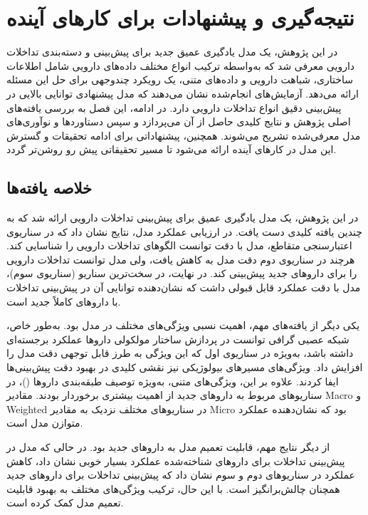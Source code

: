 \chapter{نتیجه‌گیری و پیشنهادات برای کارهای آینده}

در این پژوهش، یک مدل یادگیری عمیق جدید برای پیش‌بینی و دسته‌بندی تداخلات دارویی معرفی شد که به‌واسطه ترکیب انواع مختلف داده‌های دارویی شامل اطلاعات ساختاری، شباهت دارویی و داده‌های متنی، یک رویکرد چندوجهی برای حل این مسئله ارائه می‌دهد. آزمایش‌های انجام‌شده نشان می‌دهند که مدل پیشنهادی توانایی بالایی در پیش‌بینی دقیق انواع تداخلات دارویی دارد. در ادامه، این فصل به بررسی یافته‌های اصلی پژوهش و نتایج کلیدی حاصل از آن می‌پردازد و سپس دستاوردها و نوآوری‌های مدل معرفی‌شده تشریح می‌شوند. همچنین، پیشنهاداتی برای ادامه تحقیقات و گسترش این مدل در کارهای آینده ارائه می‌شود تا مسیر تحقیقاتی پیش رو روشن‌تر گردد.

\section{خلاصه یافته‌ها}

در این پژوهش، یک مدل یادگیری عمیق برای پیش‌بینی تداخلات دارویی ارائه شد که به چندین یافته کلیدی دست یافت. در ارزیابی عملکرد مدل، نتایج نشان داد که در سناریوی اعتبارسنجی متقاطع، مدل با دقت  توانست الگوهای تداخلات دارویی را شناسایی کند. هرچند در سناریوی دوم دقت مدل به  کاهش یافت، ولی مدل توانست تداخلات دارویی را برای داروهای جدید پیش‌بینی کند. در نهایت، در سخت‌ترین سناریو (سناریوی سوم)، مدل با دقت  عملکرد قابل قبولی داشت که نشان‌دهنده توانایی آن در پیش‌بینی تداخلات با داروهای کاملاً جدید است.	

یکی دیگر از یافته‌های مهم، اهمیت نسبی ویژگی‌های مختلف در مدل بود. به‌طور خاص، شبکه عصبی گرافی توانست در پردازش ساختار مولکولی داروها عملکرد برجسته‌ای داشته باشد، به‌ویژه در سناریوی اول که این ویژگی به طرز قابل توجهی دقت مدل را افزایش داد. ویژگی‌های مسیرهای بیولوژیکی نیز نقشی کلیدی در بهبود دقت پیش‌بینی‌ها ایفا کردند. علاوه بر این، ویژگی‌های متنی، به‌ویژه توصیف طبقه‌بندی داروها ()، در سناریوهای مربوط به داروهای جدید از اهمیت بیشتری برخوردار بودند. مقادیر Macro و Weighted در سناریوهای مختلف نزدیک به مقادیر Micro بود که نشان‌دهنده عملکرد متوازن مدل است.

از دیگر نتایج مهم، قابلیت تعمیم مدل به داروهای جدید بود. در حالی که مدل در پیش‌بینی تداخلات برای داروهای شناخته‌شده عملکرد بسیار خوبی نشان داد، کاهش عملکرد در سناریوهای دوم و سوم نشان داد که پیش‌بینی تداخلات برای داروهای جدید همچنان چالش‌برانگیز است. با این حال، ترکیب ویژگی‌های مختلف به بهبود قابلیت تعمیم مدل کمک کرده است.


